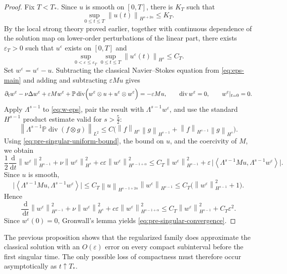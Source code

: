 \documentclass[11pt]{article}
\theoremstyle{definition}
\theoremstyle{remark}
\newcommand{\Pcal}{\mathbb{P}}
\newcommand{\dd}{\,\mathrm{d}}
\newcommand{\ip}[2]{\left\langle #1,#2\right\rangle}
\newcommand{\norm}[1]{\left\lVert #1\right\rVert}
\newcommand{\diver}{\operatorname{div}}
\begin{document}
\begin{proof}
Fix $T<T_*$. Since $u$ is smooth on $[0,T]$, there is $K_T$ such that
\[
\sup_{0\le t\le T}\norm{u(t)}_{H^{s+2\alpha}}\le K_T.
\]
By the local strong theory proved earlier, together with continuous dependence of the solution map on lower-order perturbations of the linear part, there exists $\varepsilon_T>0$ such that $u^\varepsilon$ exists on $[0,T]$ and
\begin{equation}\label{eq:pre-singular-uniform-bound}
\sup_{0<\varepsilon\le \varepsilon_T}\sup_{0\le t\le T}\norm{u^\varepsilon(t)}_{H^s}\le C_T.
\end{equation}
Set $w^\varepsilon=u^\varepsilon-u$. Subtracting the classical Navier--Stokes equation from \eqref{eq:eps-main} and adding and subtracting $\varepsilon M u$ gives
\begin{equation}\label{eq:w-eps}
\partial_t w^\varepsilon - \nu\Delta w^\varepsilon + \varepsilon M w^\varepsilon
+\Pcal\diver\Bigl(w^\varepsilon\otimes u + u^\varepsilon\otimes w^\varepsilon\Bigr)
=-\varepsilon M u,
\qquad \diver w^\varepsilon=0,
\qquad w^\varepsilon|_{t=0}=0.
\end{equation}
Apply $\Lambda^{s-1}$ to \eqref{eq:w-eps}, pair the result with $\Lambda^{s-1}w^\varepsilon$, and use the standard $H^{s-1}$ product estimate valid for $s>\frac52$:
\[
\norm{\Lambda^{s-1}\Pcal\diver(f\otimes g)}_{L^2}
\le C\bigl(\norm{f}_{H^s}\norm{g}_{H^{s-1}}+\norm{f}_{H^{s-1}}\norm{g}_{H^s}\bigr).
\]
Using \eqref{eq:pre-singular-uniform-bound}, the bound on $u$, and the coercivity of $M$, we obtain
\[
\frac12\frac{\dd}{\dd t}\norm{w^\varepsilon}_{H^{s-1}}^2
+\nu\norm{w^\varepsilon}_{H^s}^2
+c\varepsilon\norm{w^\varepsilon}_{H^{s-1+\alpha}}^2
\le C_T\norm{w^\varepsilon}_{H^{s-1}}^2
+\varepsilon\,\bigl|\ip{\Lambda^{s-1}M u}{\Lambda^{s-1}w^\varepsilon}\bigr|.
\]
Since $u$ is smooth,
\[
\bigl|\ip{\Lambda^{s-1}M u}{\Lambda^{s-1}w^\varepsilon}\bigr|
\le C_T\norm{u}_{H^{s-1+2\alpha}}\norm{w^\varepsilon}_{H^{s-1}}
\le C_T\bigl(\norm{w^\varepsilon}_{H^{s-1}}^2+1\bigr).
\]
Hence
\[
\frac{\dd}{\dd t}\norm{w^\varepsilon}_{H^{s-1}}^2
+\nu\norm{w^\varepsilon}_{H^s}^2
+c\varepsilon\norm{w^\varepsilon}_{H^{s-1+\alpha}}^2
\le C_T\norm{w^\varepsilon}_{H^{s-1}}^2 + C_T\varepsilon^2.
\]
Since $w^\varepsilon(0)=0$, Gronwall's lemma yields \eqref{eq:pre-singular-convergence}.
\end{proof}

The previous proposition shows that the regularized family does approximate the classical solution with an $O(\varepsilon)$ error on every compact subinterval before the first singular time. The only possible loss of compactness must therefore occur asymptotically as $t\uparrow T_*$.
\end{document}

